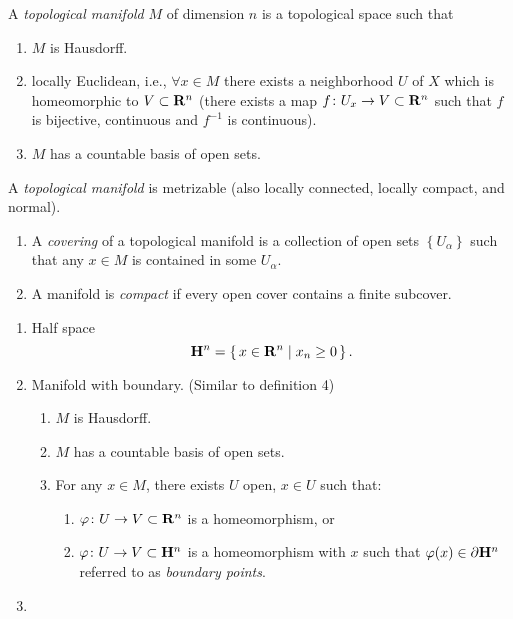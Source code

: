 \begin{definition}
A \emph{topological manifold} $M$ of dimension $n$ is a topological space
such that
\begin{enumerate}[label=(\alph*)]
\item $M$ is Hausdorff.
\item locally Euclidean, i.e., $\forall x\in M$ there exists a neighborhood
  $U$ of $X$ which is homeomorphic to $V\subset\mathbf{R}^n$ (there exists a map
  $f\colon U_x\to V\subset\mathbf{R}^n$ such that $f$ is bijective, continuous
  and $f^{-1}$ is continuous).
\item $M$ has a countable basis of open sets.
\end{enumerate}
\end{definition}
\begin{theorem}[Boothby I.3.6]
A \emph{topological manifold} is metrizable (also locally connected,
locally compact, and normal).
\end{theorem}

\begin{definition}
\begin{enumerate}[label=(\alph*)]
\item A \emph{covering} of a topological manifold is a collection of open
  sets $\left\{U_\alpha\right\}$ such that any $x\in M$ is contained in
  some $U_\alpha$.
\item A manifold is \emph{compact} if every open cover contains a finite
  subcover.
\end{enumerate}
\end{definition}

\begin{definition}
\begin{enumerate}[label=(\arabic*)]
\item Half space
\[
\mathbf{H}^n=\left\{\,x\in\mathbf{R}^n\;\middle|\;x_n\geq 0\,\right\}.
\]
\item Manifold with boundary. (Similar to definition 4)
  \begin{enumerate}[label=(\alph*)]
  \item $M$ is Hausdorff.
  \item $M$ has a countable basis of open sets.
  \item For any $x\in M$, there exists $U$ open, $x\in U$ such that:
    \begin{enumerate}[label=(\roman*)]
    \item $\varphi\colon U\to V\subset\mathbf{R}^n$ is a homeomorphism, or
    \item $\varphi\colon U\to V\subset\mathbf{H}^n$ is a homeomorphism with $x$
      such that $\varphi(x)\in\partial\mathbf{H}^n$ referred to as \emph{boundary
      points}.
    \end{enumerate}
  \end{enumerate}
\item
\end{enumerate}
\end{definition}

